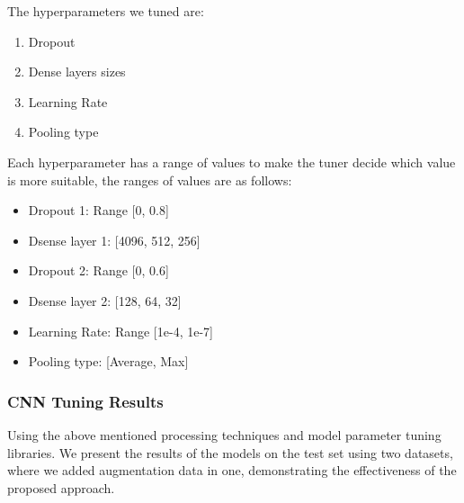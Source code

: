 \documentclass[12pt]{diazessay}
\begin{document}
     The hyperparameters we tuned are:
     \begin{enumerate}
     \item Dropout
     \item Dense layers sizes
     \item Learning Rate 
     \item Pooling type
     \end{enumerate}

     Each hyperparameter has a range of values to make the tuner decide which value is more suitable, the ranges of values are as follows:
     \begin{itemize}
     \item Dropout 1: Range [0, 0.8]
     \item Dsense layer 1: [4096, 512, 256]
     \item Dropout 2: Range [0, 0.6]
     \item Dsense layer 2: [128, 64, 32]
     \item Learning Rate: Range [1e-4, 1e-7]
     \item Pooling type: [Average, Max]
   \end{itemize}

    \subsubsection {CNN Tuning Results}
    \-\hspace{0.7cm} Using the above mentioned processing techniques and model parameter tuning libraries. We present the results of the models on the test set using two datasets, where we added augmentation data in one, demonstrating the effectiveness of the proposed approach.


   \begin{table}[H]
    \begin{center}
    \end{center}
    \caption{Models Configurations.}
    \end{table}
\end{document}
